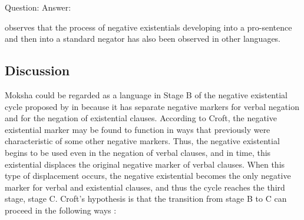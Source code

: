 \documentclass[output=paper,colorlinks,citecolor=brown,draft,draftmode]{langscibook}
\begin{document}
\begin{exe}
\ex\label{ex:moksha-sing}
Question:
Answer:
\end{exe}

\citet[127--133]{Veselinova2013} observes that the process of negative existentials developing into a pro-sentence and then into a standard negator has also been observed in other languages.

\subsection{Discussion}\label{sec:2:7.3}

Moksha could be regarded as a language in Stage B of the negative existential cycle proposed by in \citet{Croft1991} because it has separate negative markers for verbal negation and for the negation of existential clauses. According to Croft, the negative existential marker may be found to function in ways that previously were characteristic of some other negative markers. Thus,  the negative existential begins to be used even in the negation of verbal clauses, and in time, this existential displaces the original negative marker of verbal clauses. When this type of displacement occurs, the negative existential becomes the only negative marker for verbal and existential clauses, and thus the cycle reaches the third stage, stage C. Croft's hypothesis is that the transition from stage B to C can proceed in the following ways \citep[9--11]{Croft1991}:
\end{document}
